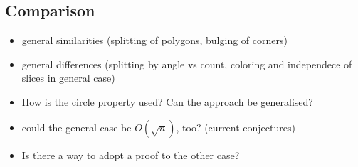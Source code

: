 \subsection{Comparison}

\begin{itemize}
  \item general similarities (splitting of polygons, bulging of corners)
  \item general differences (splitting by angle vs count, coloring and independece of slices in general case)
  \item How is the circle property used? Can the approach be generalised?
  \item could the general case be $O(\sqrt{n})$, too? (current conjectures)
  \item Is there a way to adopt a proof to the other case?
\end{itemize}
